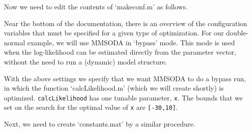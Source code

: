 
Now we need to edit the contents of `makeconf.m' as follows.


Near the bottom of the documentation, there is an overview of the configuration variables that must be specified for a given type of optimization. For our double-normal example, we will use MMSODA in `bypass' mode. This mode is used when the log-likelihood can be estimated directly from the parameter vector, without the need to run a (dynamic) model structure.



With the above settings we specify that we want MMSODA to do a bypass run, in which the function `calcLikelihood.m' (which we will create shortly) is optimized. \texttt{calcLikelihood} has one tunable parameter, \texttt{x}. The bounds that we set on the search for the optimal value of \texttt{x} are \texttt{[-30,10]}.



Next, we need to create `constants.mat' by a similar procedure.

